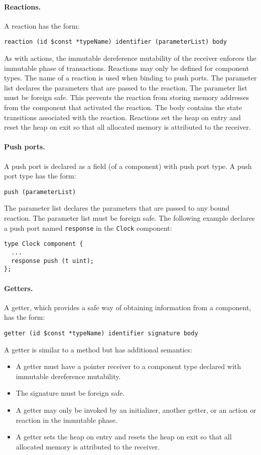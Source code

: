 \paragraph{Reactions.}
A reaction has the form:
\begin{verbatim}
reaction (id $const *typeName) identifier (parameterList) body
\end{verbatim}
As with actions, the immutable dereference mutability of the receiver enforces the immutable phase of transactions.
Reactions may only be defined for component types.
The name of a reaction is used when binding to push ports.
The parameter list declares the parameters that are passed to the reaction.
The parameter list must be foreign safe.
This prevents the reaction from storing memory addresses from the component that activated the reaction.
The body contains the state transitions associated with the reaction.
Reactions set the heap on entry and reset the heap on exit so that all allocated memory is attributed to the receiver.

\paragraph{Push ports.}
A push port is declared as a field (of a component) with push port type.
A push port type has the form:
\begin{verbatim}
push (parameterList)
\end{verbatim}
The parameter list declares the parameters that are passed to any bound reaction.
The parameter list must be foreign safe.
The following example declares a push port named \verb+response+ in the \verb+Clock+ component:
\begin{verbatim}
type Clock component {
  ...
  response push (t uint);
};
\end{verbatim}

\paragraph{Getters.}
A getter, which provides a safe way of obtaining information from a component, has the form:
\begin{verbatim}
getter (id $const *typeName) identifier signature body
\end{verbatim}
A getter is similar to a method but has additional semantics:
\begin{itemize}
\item A getter must have a pointer receiver to a component type declared with immutable dereference mutability.
\item The signature must be foreign safe.
\item A getter may only be invoked by an initializer, another getter, or an action or reaction in the immutable phase.
\item A getter sets the heap on entry and resets the heap on exit so that all allocated memory is attributed to the receiver.
\end{itemize}

